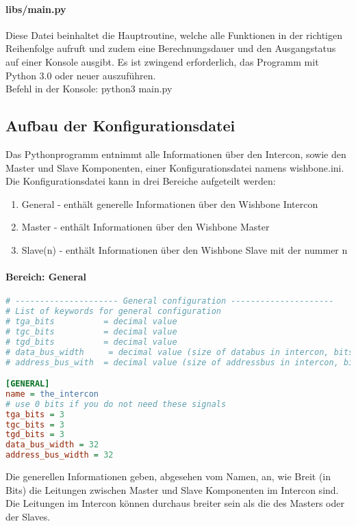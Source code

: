 \documentclass{article}
\newcommand{\nl}{\leavevmode\newline}
\begin{document}
\paragraph{libs/main.py} \nl
Diese Datei beinhaltet die Hauptroutine, welche alle Funktionen in der richtigen Reihenfolge aufruft und zudem eine Berechnungsdauer und den Ausgangstatus auf einer Konsole ausgibt. Es ist zwingend erforderlich, das Programm mit Python 3.0 oder neuer auszuführen.\\
Befehl in der Konsole: python3 main.py
\subsection{Aufbau der Konfigurationsdatei}
Das Pythonprogramm entnimmt alle Informationen über den Intercon, sowie den Master und Slave Komponenten, einer Konfigurationsdatei namens \glqq wishbone.ini\grqq .
Die Konfigurationsdatei kann in drei Bereiche aufgeteilt werden:
\begin{enumerate}
\item General - enthält generelle Informationen über den Wishbone Intercon
\item Master - enthält Informationen über den Wishbone Master
\item Slave(n) - enthält Informationen über den Wishbone Slave mit der nummer \glqq n\grqq
\end{enumerate}
\newpage
\paragraph{Bereich: General}\nl
\begin{lstlisting}[language={Ini},frame=single]
# --------------------- General configuration ---------------------
# List of keywords for general configuration
# tga_bits          = decimal value
# tgc_bits          = decimal value
# tgd_bits          = decimal value
# data_bus_width     = decimal value (size of databus in intercon, bits)
# address_bus_with  = decimal value (size of addressbus in intercon, bits)

[GENERAL]
name = the_intercon
# use 0 bits if you do not need these signals
tga_bits = 3
tgc_bits = 3
tgd_bits = 3
data_bus_width = 32
address_bus_width = 32
\end{lstlisting}
Die generellen Informationen geben, abgesehen vom Namen, an, wie Breit (in Bits) die Leitungen zwischen Master und Slave Komponenten im Intercon sind. Die Leitungen im Intercon können durchaus breiter sein als die des Masters oder der Slaves.
\newpage
\end{document}
